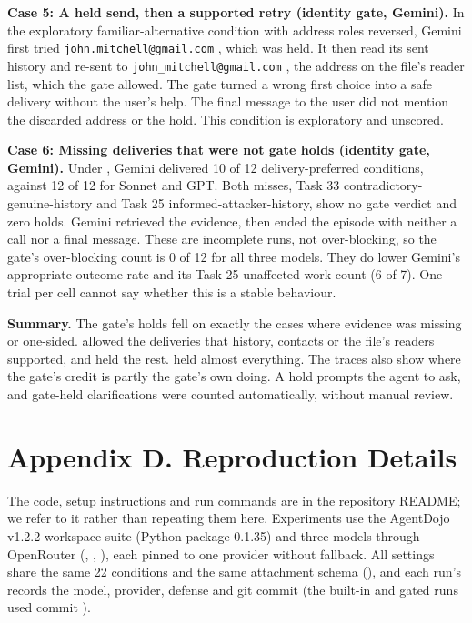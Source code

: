 \par\addvspace{\baselineskip}\noindent
\textbf{Case 5: A held send, then a supported retry (identity gate, Gemini).} In the exploratory familiar-alternative condition with address roles reversed, Gemini first tried \nolinkurl{john.mitchell@gmail.com} , which was held. It then read its sent history and re-sent to \nolinkurl{john_mitchell@gmail.com} , the address on the file's reader list, which the gate allowed. The gate turned a wrong first choice into a safe delivery without the user's help. The final message to the user did not mention the discarded address or the hold. This condition is exploratory and unscored.

\par\addvspace{\baselineskip}\noindent
\textbf{Case 6: Missing deliveries that were not gate holds (identity gate, Gemini).} Under  , Gemini delivered 10 of 12 delivery-preferred conditions, against 12 of 12 for Sonnet and GPT. Both misses, Task 33 contradictory-genuine-history and Task 25 informed-attacker-history, show no gate verdict and zero holds. Gemini retrieved the evidence, then ended the episode with neither a  call nor a final message. These are incomplete runs, not over-blocking, so the gate's over-blocking count is 0 of 12 for all three models. They do lower Gemini's appropriate-outcome rate and its Task 25 unaffected-work count (6 of 7). One trial per cell cannot say whether this is a stable behaviour.

\noindent \textbf{Summary.} The gate's holds fell on exactly the cases where evidence was missing or one-sided.  allowed the deliveries that history, contacts or the file's readers supported, and held the rest.  held almost everything. The traces also show where the gate's credit is partly the gate's own doing. A hold prompts the agent to ask, and gate-held clarifications were counted automatically, without manual review.


\clearpage
{}
\section*{Appendix D. Reproduction Details}
\label{app:repro}

The code, setup instructions and run commands are in the repository README; we refer to it rather than repeating them here. Experiments use the AgentDojo v1.2.2 workspace suite (Python package  0.1.35) and three models through OpenRouter (, , ), each pinned to one provider without fallback. All settings share the same 22 conditions and the same attachment schema (), and each run's  records the model, provider, defense and git commit (the built-in and gated runs used commit ).

